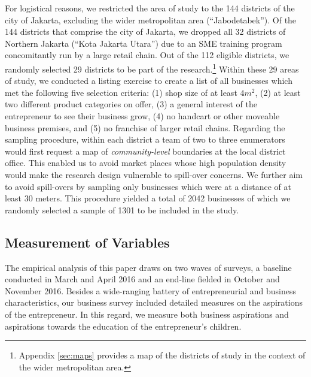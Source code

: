 \documentclass[11.5pt]{article}
\begin{document}
For logistical reasons, we restricted the area of study to the 144 districts of the city of Jakarta, excluding the wider metropolitan area (``Jabodetabek''). Of the 144 districts that comprise the city of Jakarta, we dropped all 32 districts of Northern Jakarta (``Kota Jakarta Utara'') due to an SME training program concomitantly run by a large retail chain. Out of the 112 eligible districts, we randomly selected 29 districts to be part of the research.\footnote{Appendix \ref{sec:maps} provides a map of the districts of study in the context of the wider metropolitan area.} Within these 29 areas of study, we conducted a listing exercise to create a list of all businesses which met the following five selection criteria: (1) shop size of at least $4m^2$, (2) at least two different product categories on offer, (3) a general interest of the entrepreneur to see their business grow, (4) no handcart or other moveable business premises, and (5) no franchise of larger retail chains. Regarding the sampling procedure, within each district a team of two to three enumerators would first request a map of \textit{community-level} boundaries at the local district office. This enabled us to avoid market places whose high population density would make the research design vulnerable to spill-over concerns. We further aim to avoid spill-overs by sampling only businesses which were at a distance of at least 30 meters. This procedure yielded a total of 2042 businesses of which we randomly selected a sample of 1301 to be included in the study.

\subsection{Measurement of Variables}

The empirical analysis of this paper draws on two waves of surveys, a baseline conducted in March and April 2016 and an end-line fielded in October and November 2016. Besides a wide-ranging battery of entrepreneurial and business characteristics, our business survey included detailed measures on the aspirations of the entrepreneur. In this regard, we measure both business aspirations and aspirations towards the education of the entrepreneur's children.
\end{document}
